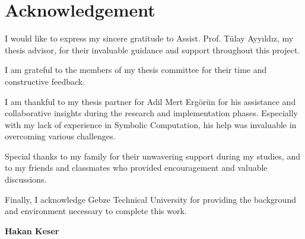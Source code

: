 \chapter*{Acknowledgement}

I would like to express my sincere gratitude to Assist. Prof. Tülay Ayyıldız, my thesis 
advisor, for their invaluable guidance and support throughout this project.

I am grateful to the members of my thesis committee for their time and 
constructive feedback.

I am thankful to my thesis partner for Adil Mert Ergörün for his assistance and collaborative insights
    during the research and implementation phases. Especially with my lack of experience in Symbolic Computation, his help was invaluable in overcoming various challenges.

Special thanks to my family for their unwavering support during my studies, 
and to my friends and classmates who provided encouragement and valuable 
discussions.

Finally, I acknowledge Gebze Technical University for providing the background and 
environment necessary to complete this work.



\vspace{1cm}
\begin{flushright}
\textbf{Hakan Keser} %
\end{flushright}
\clearpage